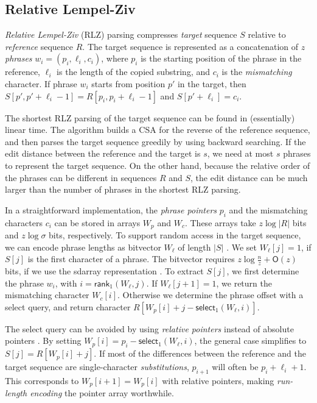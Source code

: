 \documentclass[a4paper,11pt]{llncs}
\newcommand{\abs}[1]{\ensuremath{\lvert #1 \rvert}}
\newcommand{\CSA}{\textsf{CSA}}
\newcommand{\RLZ}{\textsf{RLZ}}
\newcommand{\sdarray}{\textsf{sdarray}}
\newcommand{\select}{\textsf{select}}
\newcommand{\mrank}{\ensuremath{\mathsf{rank}}}
\newcommand{\mselect}{\ensuremath{\mathsf{select}}}
\newcommand{\Oh}{\ensuremath{\mathsf{O}}}
\begin{document}
\subsection{Relative Lempel-Ziv}\label{sect:rlz}

\emph{Relative Lempel-Ziv} (\RLZ) parsing \cite{Kuruppu2010} compresses \emph{target} sequence $S$ relative to \emph{reference} sequence $R$. The target sequence is represented as a concatenation of $z$ \emph{phrases} $w_{i} = (p_{i}, \ell_{i}, c_{i})$, where $p_{i}$ is the starting position of the phrase in the reference, $\ell_{i}$ is the length of the copied substring, and $c_{i}$ is the \emph{mismatching} character. If phrase $w_{i}$ starts from position $p'$ in the target, then $S[p',p'+\ell_{i}-1] = R[p_{i},p_{i}+\ell_{i}-1]$ and $S[p'+\ell_{i}] = c_{i}$.

The shortest \RLZ{} parsing of the target sequence can be found in (essentially) linear time. The algorithm builds a \CSA{} for the reverse of the reference sequence, and then parses the target sequence greedily by using backward searching. If the edit distance between the reference and the target is $s$, we need at most $s$ phrases to represent the target sequence. On the other hand, because the relative order of the phrases can be different in sequences $R$ and $S$, the edit distance can be much larger than the number of phrases in the shortest \RLZ{} parsing.

In a straightforward implementation, the \emph{phrase pointers} $p_{i}$ and the mismatching characters $c_{i}$ can be stored in arrays $W_{p}$ and $W_{c}$. These arrays take $z \log \abs{R}$ bits and $z \log \sigma$ bits, respectively. To support random access in the target sequence, we can encode phrase lengths as bitvector $W_{\ell}$ of length $\abs{S}$ \cite{Kuruppu2010}. We set $W_{\ell}[j] = 1$, if $S[j]$ is the first character of a phrase. The bitvector requires $z \log \frac{n}{z} + \Oh(z)$ bits, if we use the \sdarray{} representation \cite{Okanohara2007}. To extract $S[j]$, we first determine the phrase $w_{i}$, with $i = \mrank_{1}(W_{\ell}, j)$. If $W_{\ell}[j+1] = 1$, we return the mismatching character $W_{c}[i]$. Otherwise we determine the phrase offset with a \select{} query, and return character $R[W_{p}[i] + j - \mselect_{1}(W_{\ell}, i)]$.

The \select{} query can be avoided by using \emph{relative pointers} instead of absolute pointers \cite{Ferrada2014}. By setting $W_{p}[i] = p_{i} - \mselect_{1}(W_{\ell}, i)$, the general case simplifies to $S[j] = R[W_{p}[i] + j]$. If most of the differences between the reference and the target sequence are single-character \emph{substitutions}, $p_{i+1}$ will often be $p_{i} + \ell_{i} + 1$. This corresponds to $W_{p}[i+1] = W_{p}[i]$ with relative pointers, making \emph{run-length encoding} the pointer array worthwhile.
\end{document}
